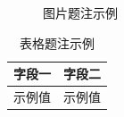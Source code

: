 
\begin{figure}[htbp]
  \centering
  \caption{图片题注示例}
  \label{fig:example}
\end{figure}

\begin{table}[htbp]
  \centering
  \caption{表格题注示例}
  \label{tab:example}
  \begin{tabular}{cc}
    \toprule
    字段一 & 字段二 \\
    \midrule
    示例值 & 示例值 \\
    \bottomrule
  \end{tabular}
\end{table}

